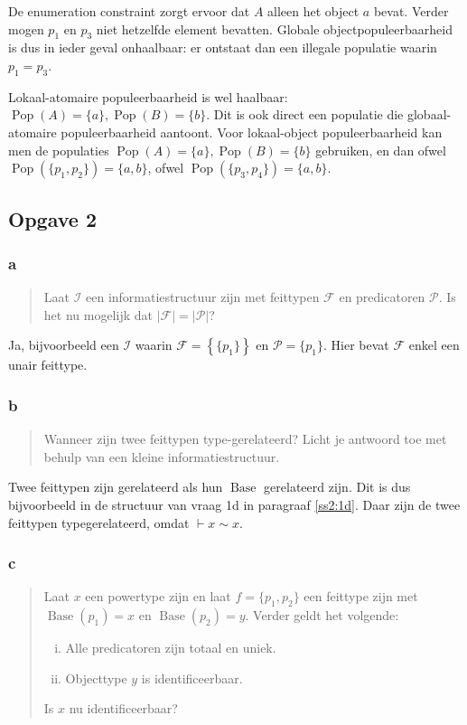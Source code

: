 \documentclass[11pt]{article}
\newcommand{\Base}{\ensuremath{\operatorname{Base}}}
\newcommand{\Pop}{\ensuremath{\operatorname{Pop}}}
\newcommand{\I}{\ensuremath{\mathcal{I}}}
\newcommand{\F}{\ensuremath{\mathcal{F}}}
\renewcommand{\P}{\ensuremath{\mathcal{P}}}
\begin{document}
De enumeration constraint zorgt ervoor dat $A$ alleen het object $a$ bevat. Verder mogen
$p_1$ en $p_3$ niet hetzelfde element bevatten. Globale objectpopuleerbaarheid is dus in 
ieder geval onhaalbaar: er ontstaat dan een illegale populatie waarin $p_1 = p_3$.

Lokaal-atomaire populeerbaarheid is wel haalbaar: $\Pop(A) = \{a\}, \Pop(B)
= \{b\}$. Dit is ook direct een populatie die globaal-atomaire populeerbaarheid
aantoont. Voor lokaal-object populeerbaarheid kan men de populaties $\Pop(A)
= \{a\}, \Pop(B) = \{b\}$ gebruiken, en dan ofwel $\Pop (\{p_1,p_2\})
= \{a,b\}$, ofwel $\Pop (\{p_3,p_4\}) = \{a,b\}$.

\subsection{Opgave 2}

\subsubsection{a}

\begin{quote}
  Laat $\I$ een informatiestructuur zijn met feittypen $\F$ en predicatoren $\P$. Is
  het nu mogelijk dat $|\F| = |\P|$? \cite{tentamen2011}
\end{quote} 

Ja, bijvoorbeeld een $\I$ waarin $\F = \left\{ \{p_1\} \right\}$ en $\P = \{
p_1\}$. Hier bevat $\F$ enkel een unair feittype.

\subsubsection{b}

\begin{quote}
  Wanneer zijn twee feittypen type-gerelateerd? Licht je antwoord toe met
  behulp van een kleine informatiestructuur. \cite{tentamen2011}
\end{quote}

Twee feittypen zijn gerelateerd als hun $\Base$ gerelateerd zijn. Dit is dus
bijvoorbeeld in de structuur van vraag 1d in paragraaf \ref{ss2:1d}. Daar zijn
de twee feittypen typegerelateerd, omdat $\vdash x \sim x$.

\subsubsection{c}

\begin{quote}
  Laat $x$ een powertype zijn en laat $f = \{p_1, p_2\}$ een feittype zijn met
  $\Base(p_1) = x$ en $\Base(p_2) = y$. Verder geldt het volgende: 

  \begin{enumerate}[i.]
    \item Alle predicatoren zijn totaal en uniek.
    \item Objecttype $y$ is identificeerbaar.
  \end{enumerate}
  Is $x$ nu identificeerbaar? \cite{tentamen2011}
\end{quote}
\end{document}
